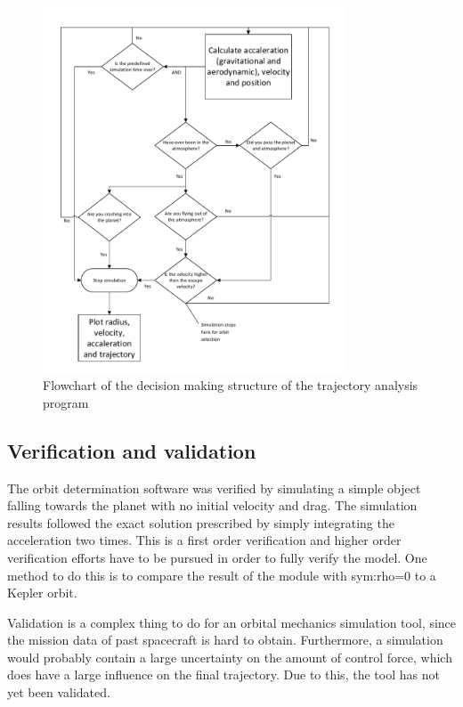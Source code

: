 \begin{figure}[H]
\centering
\hspace{-23mm}
\includegraphics[width = 0.8\textwidth]{Figure/astro_tool.pdf}
\vspace{-5mm}
\caption{Flowchart of the decision making structure of the trajectory analysis program}
\label{fig:traj_flow}
\end{figure}

\subsection{Verification and validation}
The orbit determination software was verified by simulating a simple object falling towards the planet with no initial velocity and drag. The simulation results followed the exact solution prescribed by simply integrating the acceleration two times. This is a first order verification and higher order verification efforts have to be pursued in order to fully verify the model. One method to do this is to compare the result of the module with \gls{sym:rho}=0 to a Kepler orbit.

Validation is a complex thing to do for an orbital mechanics simulation tool, since the mission data of past spacecraft is hard to obtain. Furthermore, a simulation would probably contain a large uncertainty on the amount of control force, which does have a large influence on the final trajectory. Due to this, the tool has not yet been validated.

